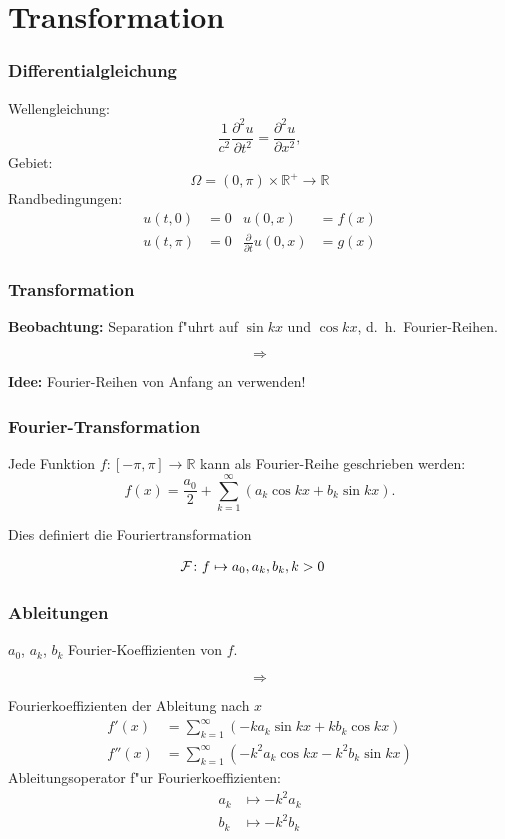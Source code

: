 \documentclass[handout]{beamer}
\begin{document}
\section{Transformation}

\begin{frame}
\frametitle{Differentialgleichung}

Wellengleichung:
\[
\frac{1}{c^2}
\frac{\partial^2 u}{\partial t^2}
=
\frac{\partial^2 u}{\partial x^2},
\]
Gebiet:
\[
\Omega = (0,\pi)\times \mathbb R^+\to \mathbb R
\]
Randbedingungen:
\begin{align*}
u(t,   0)&= 0&u(0,x)&=f(x)\\
u(t, \pi)&= 0&\frac{\partial}{\partial t}u(0,x)&=g(x)
\end{align*}

\end{frame}

\begin{frame}
\frametitle{Transformation}

{\bf Beobachtung:} Separation f"uhrt auf $\sin kx$ und $\cos kx$,
d.~h.~Fourier-Reihen.

\[
\Rightarrow
\]
\bigskip

{\bf Idee:} Fourier-Reihen von Anfang an verwenden!

\end{frame}

\begin{frame}
\frametitle{Fourier-Transformation}

Jede Funktion $f\colon [-\pi,\pi]\to\mathbb R$ kann als Fourier-Reihe
geschrieben werden:
\[
f(x)=\frac{a_0}{2}+\sum_{k=1}^\infty(a_k\cos kx+b_k\sin kx).
\]

\medskip
\pause
Dies definiert die Fouriertransformation
\medskip

\begin{align*}
{\cal F}\colon
f
&\mapsto
a_0, a_k, b_k, k> 0
\end{align*}

\end{frame}

\begin{frame}
\frametitle{Ableitungen}
$a_0$, $a_k$, $b_k$ Fourier-Koeffizienten von $f$.

\[\Rightarrow\]

Fourierkoeffizienten der Ableitung nach $x$
\begin{align*}
f'(x)&=\sum_{k=1}^\infty (-ka_k\sin kx+kb_k\cos kx)\\
f''(x)&=\sum_{k=1}^\infty (-k^2a_k\cos kx-k^2b_k\sin kx)
\end{align*}
Ableitungsoperator f"ur Fourierkoeffizienten:
\begin{align*}
a_k&\mapsto -k^2a_k\\
b_k&\mapsto -k^2b_k\\
\end{align*}
\end{frame}
\end{document}
